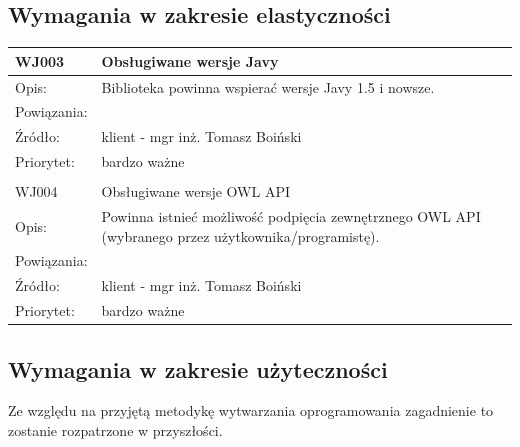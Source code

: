 \documentclass[a4paper,10pt]{article}
\begin{document}


\subsection{Wymagania w zakresie elastyczności}


\begin{center}

\begin{tabular}{|m{3cm}|m{9cm}|} \hline

WJ003 & Obsługiwane wersje Javy \\ \hline
Opis: & Biblioteka powinna wspierać wersje Javy 1.5 i nowsze.\\ \hline
Powiązania: &  \\ \hline
Źródło: & klient - mgr inż. Tomasz Boiński \\ \hline
Priorytet: & bardzo ważne \\ \hline

\multicolumn{2}{c}{} \\
 \hline

WJ004 & Obsługiwane wersje OWL API \\ \hline
Opis: & Powinna istnieć możliwość podpięcia zewnętrznego OWL API (wybranego przez użytkownika/programistę).\\ \hline
Powiązania: &  \\ \hline
Źródło: & klient - mgr inż. Tomasz Boiński \\ \hline
Priorytet: & bardzo ważne \\ \hline

\end{tabular}
 
\end{center}

\subsection{Wymagania w zakresie użyteczności}


Ze względu na przyjętą metodykę wytwarzania oprogramowania zagadnienie to zostanie rozpatrzone w przyszłości.

\end{document}

